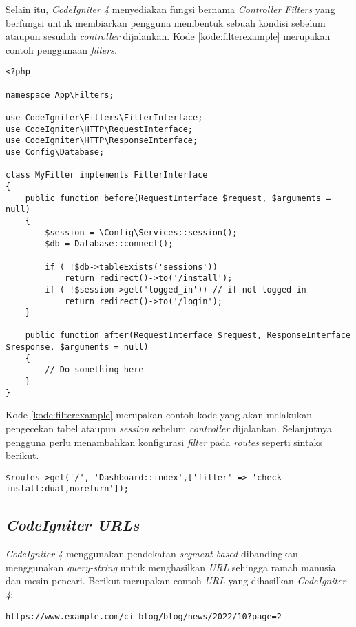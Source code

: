 Selain itu, \textit{CodeIgniter 4} menyediakan fungsi bernama \textit{Controller Filters} yang berfungsi untuk membiarkan pengguna membentuk sebuah kondisi sebelum ataupun sesudah \textit{controller} dijalankan. Kode \ref{kode:filterexample} merupakan contoh penggunaan \textit{filters}.

\begin{lstlisting}[caption=Contoh \textit{Controllers Filters} pada \textit{CodeIgniter 4},label=kode:filterexample]
<?php

namespace App\Filters;

use CodeIgniter\Filters\FilterInterface;
use CodeIgniter\HTTP\RequestInterface;
use CodeIgniter\HTTP\ResponseInterface;
use Config\Database;

class MyFilter implements FilterInterface
{
    public function before(RequestInterface $request, $arguments = null)
    {
        $session = \Config\Services::session();
        $db = Database::connect();

        if ( !$db->tableExists('sessions'))
			return redirect()->to('/install');
		if ( !$session->get('logged_in')) // if not logged in
			return redirect()->to('/login');
    }

    public function after(RequestInterface $request, ResponseInterface $response, $arguments = null)
    {
        // Do something here
    }
}
\end{lstlisting}

Kode \ref{kode:filterexample} merupakan contoh kode yang akan melakukan pengecekan tabel ataupun \textit{session} sebelum \textit{controller} dijalankan. Selanjutnya pengguna perlu menambahkan konfigurasi \textit{filter } pada \textit{routes} seperti sintaks berikut.
\begin{center}
	\verb|$routes->get('/', 'Dashboard::index',['filter' => 'check-install:dual,noreturn']);|
\end{center}

\subsection{\textit{CodeIgniter URLs}}
\textit{CodeIgniter 4} menggunakan pendekatan \textit{segment-based} dibandingkan menggunakan \textit{query-string} untuk menghasilkan \textit{URL} sehingga ramah manusia dan mesin pencari. Berikut merupakan contoh \textit{URL} yang dihasilkan \textit{CodeIgniter 4}:

\begin{center}
\texttt{https://www.example.com/ci-blog/blog/news/2022/10?page=2}
\end{center}

